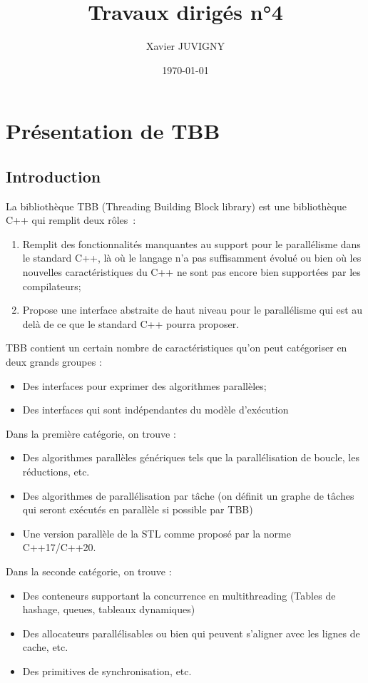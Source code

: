 \documentclass[11pt,a4paper]{article}
\author{Xavier JUVIGNY}
\date{\today}
\title{Travaux dirigés n°4}
\begin{document}
\maketitle
\tableofcontents

\section{Présentation de TBB}

\subsection{Introduction}

La bibliothèque TBB (Threading Building Block library) est une bibliothèque C++ qui remplit deux rôles~:
\begin{enumerate}
    \item Remplit des fonctionnalités manquantes au support pour le parallélisme dans le standard C++, là où le langage n'a pas
          suffisamment évolué ou bien où les nouvelles caractéristiques du C++ ne sont pas encore bien supportées par les
          compilateurs;
    \item Propose une interface abstraite de haut niveau pour le parallélisme qui est au delà de ce que le standard C++ pourra
          proposer. 
\end{enumerate}

TBB contient un certain nombre de caractéristiques qu'on peut catégoriser en deux grands groupes :
\begin{itemize}
    \item Des interfaces pour exprimer des algorithmes parallèles;
    \item Des interfaces qui sont indépendantes du modèle d'exécution
\end{itemize}

Dans la première catégorie, on trouve :
\begin{itemize}
    \item Des algorithmes parallèles génériques tels que la parallélisation de boucle, les réductions, etc.
    \item Des algorithmes de parallélisation par tâche (on définit un graphe de tâches qui seront exécutés en parallèle si possible par TBB)
    \item Une version parallèle de la STL comme proposé par la norme C++17/C++20.
\end{itemize}

Dans la seconde catégorie, on trouve :
\begin{itemize}
    \item Des conteneurs supportant la concurrence en multithreading (Tables de hashage, queues, tableaux dynamiques)
    \item Des allocateurs parallélisables ou bien qui peuvent s'aligner avec les lignes de cache, etc.
    \item Des primitives de synchronisation, etc.
\end{itemize}
\end{document}
